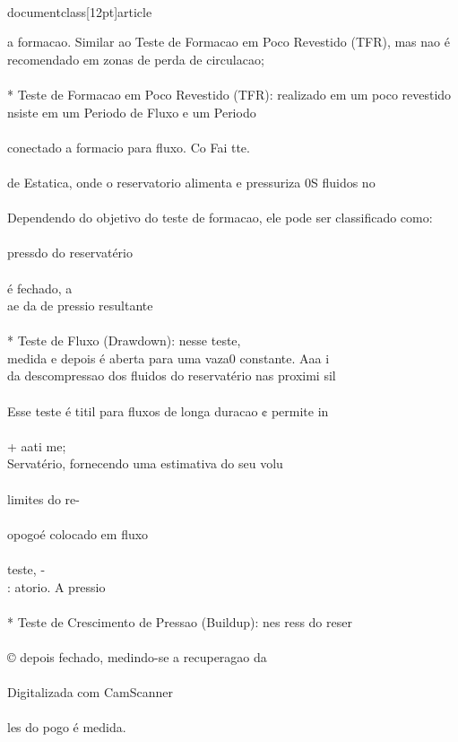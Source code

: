 \\documentclass[12pt]{article}
\begin{document}
a formacao. Similar ao Teste de Formacao em Poco Revestido (TFR), mas nao é\\
recomendado em zonas de perda de circulacao;\\
\\
* Teste de Formacao em Poco Revestido (TFR): realizado em um poco revestido\\
nsiste em um Periodo de Fluxo e um Periodo\\
\\
conectado a formacio para fluxo. Co Fai tte.\\
\\
de Estatica, onde o reservatorio alimenta e pressuriza 0S fluidos no\\
\\
Dependendo do objetivo do teste de formacao, ele pode ser classificado como:\\
\\
pressdo do reservatério\\
\\
é fechado, a\\
ae da de pressio resultante\\
\\
* Teste de Fluxo (Drawdown): nesse teste,\\
medida e depois é aberta para uma vaza0 constante. Aaa i\\
da descompressao dos fluidos do reservatério nas proximi sil\\
\\
Esse teste é titil para fluxos de longa duracao ¢ permite in\\
\\
+ aati me;\\
Servatério, fornecendo uma estimativa do seu volu\\
\\
limites do re-\\
\\
opogoé colocado em fluxo\\
\\
teste, -\\
: atorio. A pressio\\
\\
* Teste de Crescimento de Pressao (Buildup): nes ress do reser\\
\\
© depois fechado, medindo-se a recuperagao da\\
\\
Digitalizada com CamScanner\\
\\
les do pogo é medida.\\
\end{document}
